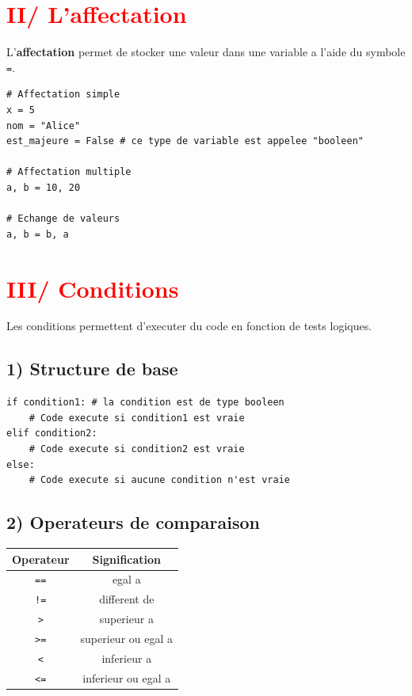 \documentclass[12pt]{article}
\begin{document}
\section*{\textcolor{red}{II/ L'affectation}}
L'\textbf{affectation} permet de stocker une valeur dans une variable a l'aide du symbole \texttt{=}.

\vspace{5pt}
\begin{lstlisting}[caption={Exemples d'affectation}]
# Affectation simple
x = 5
nom = "Alice"
est_majeure = False # ce type de variable est appelee "booleen"

# Affectation multiple
a, b = 10, 20

# Echange de valeurs
a, b = b, a
\end{lstlisting}

\vspace{10pt}
\section*{\textcolor{red}{III/ Conditions}}
Les conditions permettent d'executer du code en fonction de tests logiques.

\subsection*{1) Structure de base}
\vspace{5pt}

\begin{lstlisting}[caption={Structure \texttt{if-elif-else}}]
if condition1: # la condition est de type booleen
    # Code execute si condition1 est vraie
elif condition2:
    # Code execute si condition2 est vraie
else:
    # Code execute si aucune condition n'est vraie
\end{lstlisting}

\subsection*{2) Operateurs de comparaison}
\vspace{5pt}

\begin{center}
\begin{tabular}{|c|c|}
    \hline
    \textbf{Operateur} & \textbf{Signification} \\
    \hline
    \texttt{==} & egal a \\
    \hline
    \texttt{!=} & different de \\
    \hline
    \texttt{>} & superieur a \\
    \hline
    \texttt{>=} & superieur ou egal a \\
    \hline
    \texttt{<} & inferieur a \\
    \hline
    \texttt{<=} & inferieur ou egal a \\
    \hline
\end{tabular}
\end{center}
\end{document}
